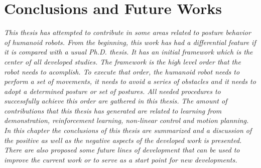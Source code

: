 \chapter{Conclusions and Future Works}\label{ch_conclusions}
\textit{ This thesis has attempted to contribute in some areas related to  posture behavior of humanoid robots.  From the beginning, this work has had a differential feature if it is compared with a usual Ph.D. thesis. It has an initial framework which is the center of all  developed studies. The framework is the high level order  \robotorder that the robot needs to acomplish. To execute that order, the humanoid robot needs to perform a set of  movements, it needs to avoid a series of obstacles and it needs to adopt a determined posture or set of postures. All needed procedures to successfully achieve this order are gathered in this thesis. The amount of contributions that this thesis has generated are related to learning from demonstration, reinforcement learning, non-linear control and motion planning. In this chapter the conclusions of this thesis are summarized and a discussion of the positive  as well as the negative aspects of the developed work is presented. There are also proposed some future lines of development that can be used to improve the current work or to serve as a start point for new developments. }
\newpage
%
%
%
%






